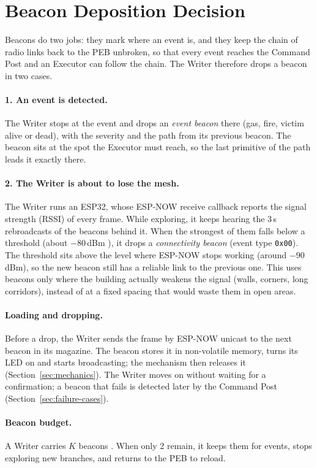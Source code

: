 \section{Beacon Deposition Decision}

Beacons do two jobs: they mark where an event is, and they keep the chain of
radio links back to the PEB unbroken, so that every event reaches the Command
Post and an Executor can follow the chain. The Writer therefore drops a
beacon in two cases.

\paragraph{1. An event is detected.} The Writer stops at the event and drops
an \emph{event beacon} there (gas, fire, victim alive or dead), with the
severity and the path from its previous beacon. The beacon sits at the spot
the Executor must reach, so the last primitive of the path leads it exactly
there.

\paragraph{2. The Writer is about to lose the mesh.} The Writer runs an
ESP32, whose ESP-NOW receive callback reports the signal strength (RSSI) of
every frame. While exploring, it keeps hearing the 3\,s rebroadcasts of the
beacons behind it. When the strongest of them falls below a threshold
(about $-80$\,dBm ), it drops a \emph{connectivity beacon}
(event type \texttt{0x00}). The threshold sits above the level where ESP-NOW
stops working (around $-90$\,dBm), so the new beacon still has a reliable
link to the previous one. This uses beacons only where the building actually
weakens the signal (walls, corners, long corridors), instead of at a fixed
spacing that would waste them in open areas.

\paragraph{Loading and dropping.} Before a drop, the Writer sends the frame
by ESP-NOW unicast to the next beacon in its magazine. The beacon stores it
in non-volatile memory, turns its LED on and starts broadcasting; the
mechanism then releases it (Section~\ref{sec:mechanics}). The Writer moves on
without waiting for a confirmation; a beacon that fails is detected later by
the Command Post (Section~\ref{sec:failure-cases}).

\paragraph{Beacon budget.} A Writer carries $K$ beacons . When only 2 remain, it keeps them for events, stops exploring new
branches, and returns to the PEB to reload.
